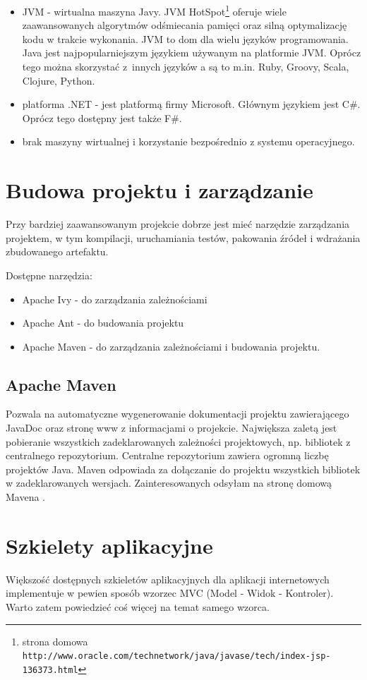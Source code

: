 \documentclass[a4paper,onecolumn,oneside,11pt,wide,floatssmall]{mwrep}
\def\url#1{{ \tt #1}}
\theoremstyle{definition}
\theoremstyle{plain}%
\theoremstyle{remark}
\begin{document}
\begin{itemize}
  \item JVM - wirtualna maszyna Javy. JVM HotSpot\footnote{strona domowa \url{http://www.oracle.com/technetwork/java/javase/tech/index-jsp-136373.html}} oferuje wiele zaawansowanych algorytmów odśmiecania pamięci oraz silną optymalizację kodu w trakcie wykonania. JVM to dom dla wielu języków programowania. Java jest najpopularniejszym językiem używanym na platformie JVM. Oprócz tego można skorzystać \mbox{z innych} języków a są to m.in. Ruby, Groovy, Scala, Clojure, Python. 
  \item platforma .NET - jest platformą firmy Microsoft. Głównym językiem jest C\#. Oprócz tego dostępny jest także F\#.
  \item brak maszyny wirtualnej i korzystanie bezpośrednio z systemu operacyjnego.
\end{itemize}

\section{Budowa projektu i zarządzanie}
Przy bardziej zaawansowanym projekcie dobrze jest mieć narzędzie zarządzania projektem, w tym kompilacji, uruchamiania testów, pakowania źródeł i wdrażania zbudowanego artefaktu. 

Dostępne narzędzia:
\begin{itemize}
  \item Apache Ivy - do zarządzania zależnościami
  \item Apache Ant - do budowania projektu
  \item Apache Maven - do zarządzania zależnościami i budowania projektu.
\end{itemize}

\subsection{Apache Maven}
Pozwala na automatyczne wygenerowanie dokumentacji projektu zawierającego JavaDoc oraz 
stronę www z informacjami o projekcie. Największa zaletą jest pobieranie wszystkich zadeklarowanych zależności 
projektowych, np. bibliotek z centralnego repozytorium. Centralne repozytorium zawiera ogromną liczbę projektów Java. Maven odpowiada za dołączanie do projektu wszystkich bibliotek w zadeklarowanych wersjach.
Zainteresowanych odsyłam na stronę domową Mavena \cite{mavenHome}.

\section{Szkielety aplikacyjne}
Większość dostępnych szkieletów aplikacyjnych dla aplikacji internetowych implementuje w pewien sposób wzorzec MVC (Model - Widok - Kontroler). Warto zatem powiedzieć coś więcej na temat samego wzorca. 
\end{document}
